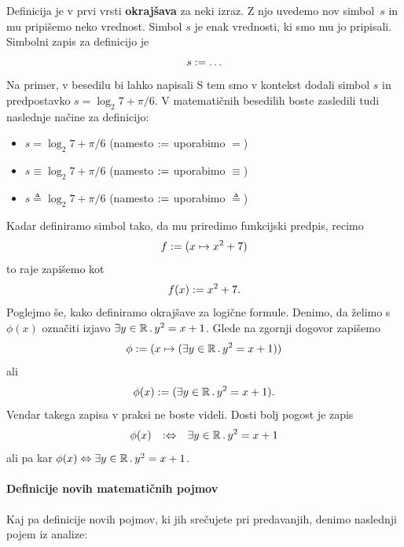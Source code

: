 Definicija je v prvi vrsti \textbf{okrajšava} za neki izraz. Z njo uvedemo nov simbol~$s$ in mu pripišemo neko vrednost. Simbol $s$ je enak vrednosti, ki smo mu jo pripisali. Simbolni zapis za definicijo je
%
\begin{equation*}
  s \mathrel{{:}{=}} \ldots
\end{equation*}
%
Na primer, v besedilu bi lahko napisali  S tem smo v kontekst dodali simbol $s$ in predpostavko $s = \log_2 7 + \pi/6$. V matematičnih besedilih boste zasledili tudi naslednje načine za definicijo:
%
\begin{itemize}
\item $s = \log_2 7 + \pi/6$ (namesto $\mathrel{{:}{=}}$ uporabimo $=$)
\item $s \equiv \log_2 7 + \pi/6$ (namesto $\mathrel{{:}{=}}$ uporabimo $\equiv$)
\item $s \triangleq \log_2 7 + \pi/6$ (namesto $\mathrel{{:}{=}}$ uporabimo $\triangleq$)
\end{itemize}
%
Kadar definiramo simbol tako, da mu priredimo funkcijski predpis, recimo
%
\begin{equation*}
  f \mathrel{{:}{=}} (x \mapsto x^2 + 7)
\end{equation*}
%
to raje zapišemo kot
%
\begin{equation*}
  f(x) \mathrel{{:}{=}} x^2 + 7.
\end{equation*}
%
Poglejmo še, kako definiramo okrajšave za logične formule. Denimo, da želimo s $\phi(x)$ označiti izjavo $\exists y \in \mathbb{R} \,.\, y^2 = x + 1$. Glede na zgornji dogovor zapišemo
%
\begin{equation*}
  \phi \mathrel{{:}{=}} (x \mapsto (\exists y \in \mathbb{R} \,.\, y^2 = x + 1))
\end{equation*}
%
ali
%
\begin{equation*}
  \phi(x) \mathrel{{:}{=}} (\exists y \in \mathbb{R} \,.\, y^2 = x + 1).
\end{equation*}
%
Vendar takega zapisa v praksi ne boste videli. Dosti bolj pogost je zapis
%
\begin{equation*}
  \phi(x) \quad {{:}{\Leftrightarrow}}\quad \exists y \in \mathbb{R} \,.\, y^2 = x + 1
\end{equation*}
%
ali pa kar $\phi(x) \Leftrightarrow \exists y \in \mathbb{R} \,.\, y^2 = x + 1$.

\paragraph*{Definicije novih matematičnih pojmov}

Kaj pa definicije novih pojmov, ki jih srečujete pri predavanjih, denimo naslednji pojem iz analize:

